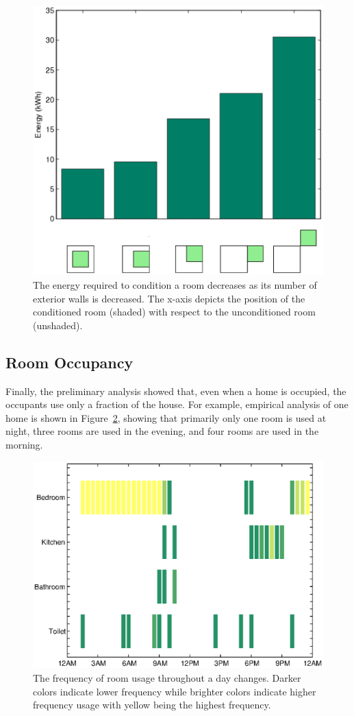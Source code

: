 \begin{figure}[ht]
  \centering
  \includegraphics[width=0.55\columnwidth]{fig/wallsVsEnergyRoom}
  \caption[Effect of Exterior Walls on Energy Usage]{The energy required to
    condition a room decreases as its number of exterior walls is decreased.
    The x-axis depicts the position of the conditioned room (shaded) with
    respect to the unconditioned room (unshaded).}
  \label{fig:wallsVsEnergyRoom}
\end{figure}

\subsection{Room Occupancy}

Finally, the preliminary analysis showed that, even when a home is occupied, the
occupants use only a fraction of the house. For example, empirical analysis of
one home is shown in Figure~\ref{fig:roomUsage}, showing that primarily only one
room is used at night, three rooms are used in the evening, and four rooms are
used in the morning.

\begin{figure}[ht]
  \centering
  \includegraphics[width=0.6\columnwidth]{fig/roomUsage}
  \caption[Frequency of Room Usage Throughout a Day]{The frequency of room usage
    throughout a day changes. Darker colors indicate lower frequency while
    brighter colors indicate higher frequency usage with yellow being the
    highest frequency.}
  \label{fig:roomUsage}
\end{figure}

